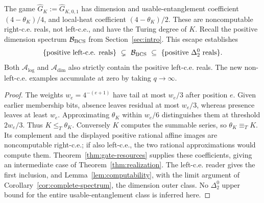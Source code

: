 \begin{corollary}\label{cor:gate-strict}
The game $\widehat G_K:=\widehat G_{K,0,1}$ has dimension and usable-entanglement coefficient $(4-\theta_K)/4$, and local-heat coefficient $(4-\theta_K)/2$. These are noncomputable right-c.e. reals, not left-c.e., and have the Turing degree of $K$. Recall the positive dimension spectrum $\mathcal B_{\rm BCS}$ from Section~\ref{sec:intro}. This escape establishes
\begin{equation}\label{eq:strict-spectrum}
 \{\text{positive left-c.e. reals}\}\ \subsetneq\ \mathcal B_{\rm BCS}
 \ \subseteq\ \{\text{positive }\Delta^0_2\text{ reals}\}.
\end{equation}
Both $\mathcal A_{\log}$ and $\mathcal A_{\dim}$ also strictly contain the positive left-c.e. reals. The new non-left-c.e. examples accumulate at zero by taking $q\to\infty$.
\end{corollary}
\begin{proof}
The weights $w_e=4^{-(e+1)}$ have tail at most $w_e/3$ after position $e$. Given earlier membership bits, absence leaves residual at most $w_e/3$, whereas presence leaves at least $w_e$. Approximating $\theta_K$ within $w_e/6$ distinguishes them at threshold $2w_e/3$. Thus $K\le_T\theta_K$. Conversely $K$ computes the summable series, so $\theta_K\equiv_TK$. Its complement and the displayed positive rational affine images are noncomputable right-c.e.; if also left-c.e., the two rational approximations would compute them. Theorem~\ref{thm:gate-resources} supplies these coefficients, giving an intermediate case of Theorem~\ref{thm:realization}. The left-c.e. reader gives the first inclusion, and Lemma~\ref{lem:computability}, with the limit argument of Corollary~\ref{cor:complete-spectrum}, the dimension outer class. No $\Delta^0_2$ upper bound for the entire usable-entanglement class is inferred here.
\end{proof}

